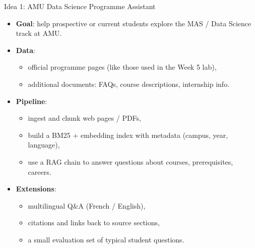 \documentclass[aspectratio=169]{beamer}
\begin{document}
\begin{frame}{Idea 1: AMU Data Science Programme Assistant}
  \begin{itemize}
    \item \textbf{Goal}: help prospective or current students explore the MAS / Data Science track at AMU.
    \item \textbf{Data}:
      \begin{itemize}
        \item official programme pages (like those used in the Week 5 lab),
        \item additional documents: FAQs, course descriptions, internship info.
      \end{itemize}
    \item \textbf{Pipeline}:
      \begin{itemize}
        \item ingest and chunk web pages / PDFs,
        \item build a BM25 + embedding index with metadata (campus, year, language),
        \item use a RAG chain to answer questions about courses, prerequisites, careers.
      \end{itemize}
    \item \textbf{Extensions}:
      \begin{itemize}
        \item multilingual Q\&A (French / English),
        \item citations and links back to source sections,
        \item a small evaluation set of typical student questions.
      \end{itemize}
  \end{itemize}
\end{frame}
\end{document}
